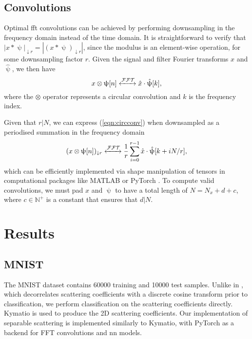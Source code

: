 \subsection{Convolutions}
Optimal \ac{fft} convolutions can be achieved by performing downsampling in the frequency domain instead of the time domain. It is straightforward to verify that $|x * \uppsi|_{\downarrow r} = \left|(x * \uppsi)_{\downarrow r}\right|$, since the modulus is an element-wise operation, for some downsampling factor $r$. Given the signal and filter Fourier transforms $\hat{x}$ and $\hat{\uppsi}$, we then have
\begin{equation}
\label{eqn:circconv}
    x \otimes \uppsi [n] \xleftrightarrow{\mathcal{FFT}}  \hat{x} \cdot \hat{\uppsi} [k],
\end{equation}
where the $\otimes$ operator represents a circular convolution and $k$ is the frequency index.

Given that $r|N$, we can express (\ref{eqn:circconv}) when downsampled as a periodised summation \cite{waveletsandsubbandcoding} in the frequency domain
\begin{equation}
    (x \otimes \uppsi [n])_{\downarrow r} \xleftrightarrow{\mathcal{FFT}}  \frac{1}{r} \sum_{i=0}^{r-1} \hat{x} \cdot \hat{\uppsi} [k + iN/r], %
\end{equation}
which can be efficiently implemented via shape manipulation of tensors in computational packages like MATLAB or PyTorch \cite{pytorch}. To compute valid convolutions, we must pad $x$ and $\uppsi$ to have a total length of $N = N_x + d + c$, where $c \in \mathbb{N}^+$ is a constant that ensures that $d | N$. 


\section{Results}



\subsection{MNIST}


The MNIST dataset \cite{mnist} contains 60000 training and 10000 test samples. Unlike in \cite{2dscattering}, which decorrelates scattering coefficients with a discrete cosine transform prior to classification, we perform classification on the scattering coefficients directly. Kymatio \cite{kymatio} is used to produce the 2D scattering coefficients. Our implementation of separable scattering is implemented similarly to Kymatio, with PyTorch \cite{pytorch} as a backend for FFT convolutions and \ac{nn} models.

